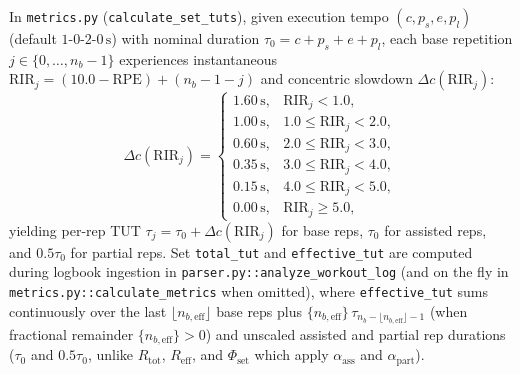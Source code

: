 \documentclass[10pt,twocolumn,letterpaper]{article}
\theoremstyle{plain}
\theoremstyle{definition}
\begin{document}
In \texttt{metrics.py} (\texttt{calculate\_set\_tuts}), given execution tempo $(c, p_s, e, p_l)$ (default $1\text{-}0\text{-}2\text{-}0\,\text{s}$) with nominal duration $\tau_0 = c + p_s + e + p_l$, each base repetition $j \in \{0, \dots, n_b - 1\}$ experiences instantaneous $\mathrm{RIR}_j = (10.0 - \mathrm{RPE}) + (n_b - 1 - j)$ and concentric slowdown $\Delta c(\mathrm{RIR}_j)$:
\begin{equation}
  \Delta c(\mathrm{RIR}_j) =
  \begin{cases}
    1.60\,\text{s}, & \mathrm{RIR}_j < 1.0, \\
    1.00\,\text{s}, & 1.0 \le \mathrm{RIR}_j < 2.0, \\
    0.60\,\text{s}, & 2.0 \le \mathrm{RIR}_j < 3.0, \\
    0.35\,\text{s}, & 3.0 \le \mathrm{RIR}_j < 4.0, \\
    0.15\,\text{s}, & 4.0 \le \mathrm{RIR}_j < 5.0, \\
    0.00\,\text{s}, & \mathrm{RIR}_j \ge 5.0,
  \end{cases}
\end{equation}
yielding per-rep TUT $\tau_j = \tau_0 + \Delta c(\mathrm{RIR}_j)$ for base reps, $\tau_0$ for assisted reps, and $0.5\tau_0$ for partial reps. Set \texttt{total\_tut} and \texttt{effective\_tut} are computed during logbook ingestion in \texttt{parser.py::analyze\_workout\_log} (and on the fly in \texttt{metrics.py::calculate\_metrics} when omitted), where \texttt{effective\_tut} sums continuously over the last $\lfloor n_{b,\mathrm{eff}} \rfloor$ base reps plus $\{n_{b,\mathrm{eff}}\}\,\tau_{n_b - \lfloor n_{b,\mathrm{eff}} \rfloor - 1}$ (when fractional remainder $\{n_{b,\mathrm{eff}}\} > 0$) and unscaled assisted and partial rep durations ($\tau_0$ and $0.5\tau_0$, unlike $R_{\mathrm{tot}}$, $R_{\mathrm{eff}}$, and $\Phi_{\mathrm{set}}$ which apply $\alpha_{\mathrm{ass}}$ and $\alpha_{\mathrm{part}}$).
\end{document}
